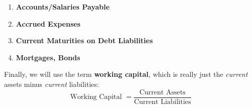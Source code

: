 \documentclass{article}
\begin{document}
    \begin{definition}[Liabilities]
      \begin{enumerate}
        \item \textbf{Accounts/Salaries Payable}
        \item \textbf{Accrued Expenses}
        \item \textbf{Current Maturities on Debt Liabilities}
        \item \textbf{Mortgages, Bonds}
      \end{enumerate}
    \end{definition}

    \begin{definition}
      Finally, we will use the term \textbf{working capital}, which is really just the \textit{current} assets minus \textit{current} liabilities:
      \begin{equation}
        \text{Working Capital } = \frac{\text{Current Assets}}{\text{Current Liabilities}}
      \end{equation}
    \end{definition}
\end{document}

